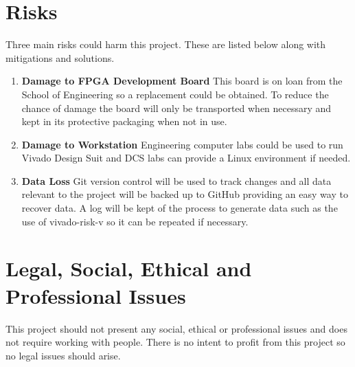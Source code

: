 \documentclass[a4paper,fleqn,12pt]{article}
\begin{document}
	\section{Risks}
	Three main risks could harm this project. These are listed below along with mitigations and solutions.
	\begin{enumerate}
		\item \textbf{Damage to FPGA Development Board} \newline
		This board is on loan from the School of Engineering so a replacement could be obtained. To reduce the chance of damage the board will only be transported when necessary and kept in its protective packaging when not in use.
		\item \textbf{Damage to Workstation} \newline
		Engineering computer labs could be used to run Vivado Design Suit and DCS labs can provide a Linux environment if needed.
		\item \textbf{Data Loss} \newline
		Git version control will be used to track changes and all data relevant to the project will be backed up to GitHub providing an easy way to recover data. A log will be kept of the process to generate data such as the use of vivado-risk-v so it can be repeated if necessary.
	\end{enumerate}
	
	\section{Legal, Social, Ethical and Professional Issues}
	This project should not present any social, ethical or professional issues and does not require working with people. There is no intent to profit from this project so no legal issues should arise.
	
	\newpage
	
	
	
\end{document}
